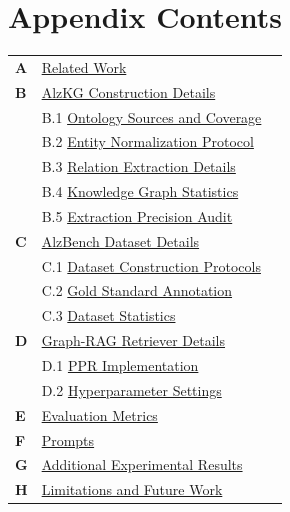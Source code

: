 \documentclass{article}
\begin{document}
\section*{Appendix Contents}
\begin{tabular}{@{}ll r@{}}
\textbf{A} & \hyperref[app:related]{Related Work} & \pageref{app:related} \\[2pt]
\textbf{B} & \hyperref[app:kg-details]{AlzKG Construction Details} & \pageref{app:kg-details} \\
 & \hspace{1em}B.1 \hyperref[app:ontology-sources]{Ontology Sources and Coverage} & \pageref{app:ontology-sources} \\
 & \hspace{1em}B.2 \hyperref[app:entity-norm]{Entity Normalization Protocol} & \pageref{app:entity-norm} \\
 & \hspace{1em}B.3 \hyperref[app:relation-extraction]{Relation Extraction Details} & \pageref{app:relation-extraction} \\
 & \hspace{1em}B.4 \hyperref[app:kg-stats-detailed]{Knowledge Graph Statistics} & \pageref{app:kg-stats-detailed} \\
 & \hspace{1em}B.5 \hyperref[app:audit]{Extraction Precision Audit} & \pageref{app:audit} \\[2pt]
\textbf{C} & \hyperref[app:bench-details]{AlzBench Dataset Details} & \pageref{app:bench-details} \\
 & \hspace{1em}C.1 \hyperref[app:dataset-construction]{Dataset Construction Protocols} & \pageref{app:dataset-construction} \\
 & \hspace{1em}C.2 \hyperref[app:gold-standard]{Gold Standard Annotation} & \pageref{app:gold-standard} \\
 & \hspace{1em}C.3 \hyperref[app:dataset-stats]{Dataset Statistics} & \pageref{app:dataset-stats} \\[2pt]
\textbf{D} & \hyperref[app:retriever-details]{Graph-RAG Retriever Details} & \pageref{app:retriever-details} \\
 & \hspace{1em}D.1 \hyperref[app:ppr-impl]{PPR Implementation} & \pageref{app:ppr-impl} \\
 & \hspace{1em}D.2 \hyperref[app:retriever-hyperparams]{Hyperparameter Settings} & \pageref{app:retriever-hyperparams} \\[2pt]
\textbf{E} & \hyperref[app:metrics]{Evaluation Metrics} & \pageref{app:metrics} \\
\textbf{F} & \hyperref[app:prompts]{Prompts} & \pageref{app:prompts} \\
\textbf{G} & \hyperref[app:additional]{Additional Experimental Results} & \pageref{app:additional} \\
\textbf{H} & \hyperref[sec:limitations]{Limitations and Future Work} & \pageref{sec:limitations} \\
\end{tabular}
\end{document}

